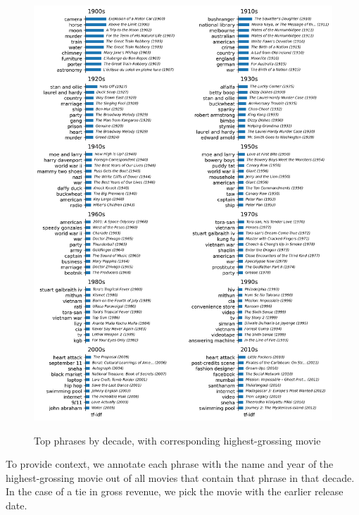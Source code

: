 \documentclass{article}
\begin{document}
\begin{multicols}{2}
\begin{figure}
\caption{Top phrases by decade, with corresponding highest-grossing movie}
\centering
\includegraphics[width=.95\textwidth]{figures/top_phrases_by_decade_bar_chart.png}
\label{figure:top_phrases_by_decade}
\end{figure}

To provide context, we annotate each phrase with the name and year of the highest-grossing movie out of all movies that contain that phrase in that decade. In the case of a tie in gross revenue, we pick the movie with the earlier release date.


\end{multicols}
\end{document}
